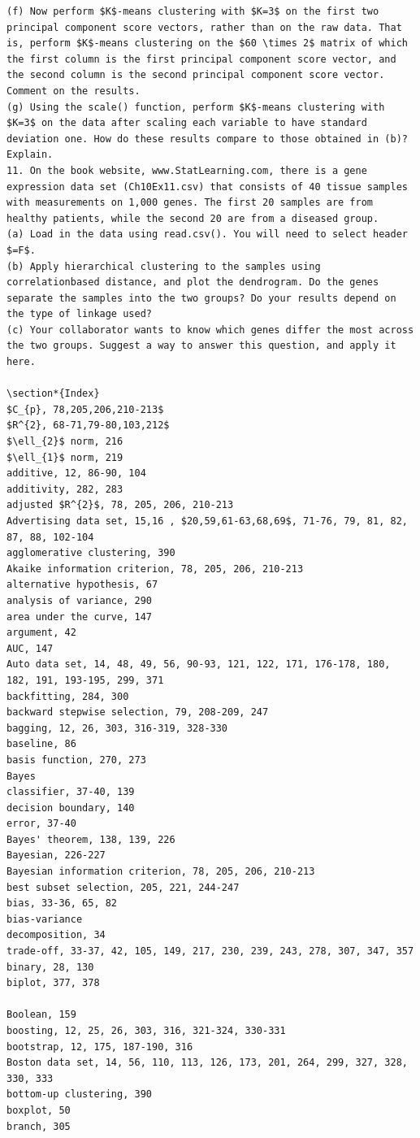 \documentclass[10pt]{article}
\begin{document}
\begin{verbatim}
(f) Now perform $K$-means clustering with $K=3$ on the first two principal component score vectors, rather than on the raw data. That is, perform $K$-means clustering on the $60 \times 2$ matrix of which the first column is the first principal component score vector, and the second column is the second principal component score vector. Comment on the results.
(g) Using the scale() function, perform $K$-means clustering with $K=3$ on the data after scaling each variable to have standard deviation one. How do these results compare to those obtained in (b)? Explain.
11. On the book website, www.StatLearning.com, there is a gene expression data set (Ch10Ex11.csv) that consists of 40 tissue samples with measurements on 1,000 genes. The first 20 samples are from healthy patients, while the second 20 are from a diseased group.
(a) Load in the data using read.csv(). You will need to select header $=F$.
(b) Apply hierarchical clustering to the samples using correlationbased distance, and plot the dendrogram. Do the genes separate the samples into the two groups? Do your results depend on the type of linkage used?
(c) Your collaborator wants to know which genes differ the most across the two groups. Suggest a way to answer this question, and apply it here.

\section*{Index}
$C_{p}, 78,205,206,210-213$
$R^{2}, 68-71,79-80,103,212$
$\ell_{2}$ norm, 216
$\ell_{1}$ norm, 219
additive, 12, 86-90, 104
additivity, 282, 283
adjusted $R^{2}$, 78, 205, 206, 210-213
Advertising data set, 15,16 , $20,59,61-63,68,69$, 71-76, 79, 81, 82, 87, 88, 102-104
agglomerative clustering, 390
Akaike information criterion, 78, 205, 206, 210-213
alternative hypothesis, 67
analysis of variance, 290
area under the curve, 147
argument, 42
AUC, 147
Auto data set, 14, 48, 49, 56, 90-93, 121, 122, 171, 176-178, 180, 182, 191, 193-195, 299, 371
backfitting, 284, 300
backward stepwise selection, 79, 208-209, 247
bagging, 12, 26, 303, 316-319, 328-330
baseline, 86
basis function, 270, 273
Bayes
classifier, 37-40, 139
decision boundary, 140
error, 37-40
Bayes' theorem, 138, 139, 226
Bayesian, 226-227
Bayesian information criterion, 78, 205, 206, 210-213
best subset selection, 205, 221, 244-247
bias, 33-36, 65, 82
bias-variance
decomposition, 34
trade-off, 33-37, 42, 105, 149, 217, 230, 239, 243, 278, 307, 347, 357
binary, 28, 130
biplot, 377, 378

Boolean, 159
boosting, 12, 25, 26, 303, 316, 321-324, 330-331
bootstrap, 12, 175, 187-190, 316
Boston data set, 14, 56, 110, 113, 126, 173, 201, 264, 299, 327, 328, 330, 333
bottom-up clustering, 390
boxplot, 50
branch, 305


\end{verbatim}
\end{document}
